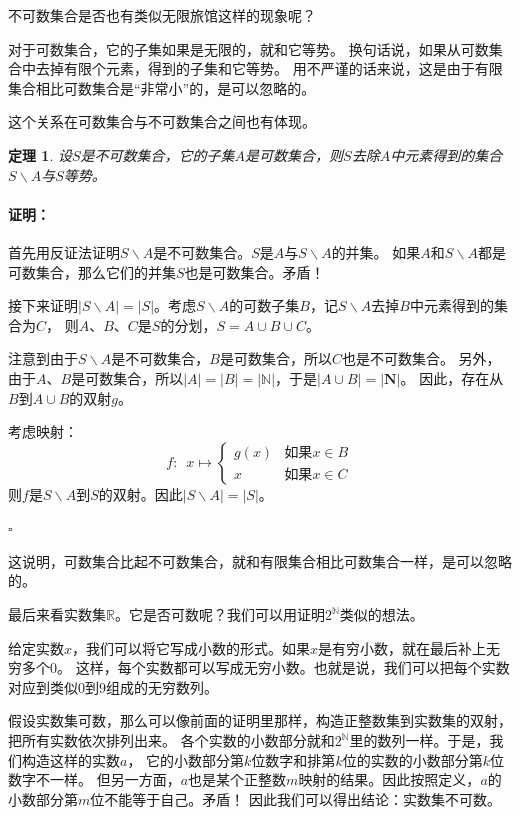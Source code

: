 \documentclass[12pt,UTF8]{ctexbook}
\renewenvironment{proof}{\paragraph{\textbf{证明：}}}{\hfill$\square$}
\newtheorem{tm}{定理}[section]
\begin{document}
不可数集合是否也有类似无限旅馆这样的现象呢？

对于可数集合，它的子集如果是无限的，就和它等势。
换句话说，如果从可数集合中去掉有限个元素，得到的子集和它等势。
用不严谨的话来说，这是由于有限集合相比可数集合是“非常小”的，是可以忽略的。

这个关系在可数集合与不可数集合之间也有体现。

\begin{tm}
    设$S$是不可数集合，它的子集$A$是可数集合，则$S$去除$A$中元素得到的集合$S\backslash A$与$S$等势。
\end{tm}

\begin{proof}
    首先用反证法证明$S\backslash A$是不可数集合。$S$是$A$与$S\backslash A$的并集。
    如果$A$和$S\backslash A$都是可数集合，那么它们的并集$S$也是可数集合。矛盾！

    接下来证明$|S\backslash A| = |S|$。考虑$S\backslash A$的可数子集$B$，记$S\backslash A$去掉$B$中元素得到的集合为$C$，
    则$A$、$B$、$C$是$S$的分划，$S = A\cup B\cup C$。
    
    注意到由于$S\backslash A$是不可数集合，$B$是可数集合，所以$C$也是不可数集合。
    另外，由于$A$、$B$是可数集合，所以$ |A| = |B| = |\mathbb{N}|$，于是$|A\cup B| = |\mathbf{N}|$。
    因此，存在从$B$到$A\cup B$的双射$g$。

    考虑映射：
    $$ f:\,\,\,x\mapsto \left\{
        \begin{array}{cl}
            g(x) & \mbox{如果}x\in B \\
            x & \mbox{如果}x \in C
        \end{array}\right.
    $$
    则$f$是$S\backslash A$到$S$的双射。因此$|S\backslash A| = |S|$。
    
\end{proof}

这说明，可数集合比起不可数集合，就和有限集合相比可数集合一样，是可以忽略的。

最后来看实数集$\mathbb{R}$。它是否可数呢？我们可以用证明$2^\mathbb{N}$类似的想法。

给定实数$x$，我们可以将它写成小数的形式。如果$x$是有穷小数，就在最后补上无穷多个$0$。
这样，每个实数都可以写成无穷小数。也就是说，我们可以把每个实数对应到类似$0$到$9$组成的无穷数列。

假设实数集可数，那么可以像前面的证明里那样，构造正整数集到实数集的双射，把所有实数依次排列出来。
各个实数的小数部分就和$2^\mathbb{N}$里的数列一样。于是，我们构造这样的实数$a$，
它的小数部分第$k$位数字和排第$k$位的实数的小数部分第$k$位数字不一样。
但另一方面，$a$也是某个正整数$m$映射的结果。因此按照定义，$a$的小数部分第$m$位不能等于自己。矛盾！
因此我们可以得出结论：实数集不可数。
\end{document}
